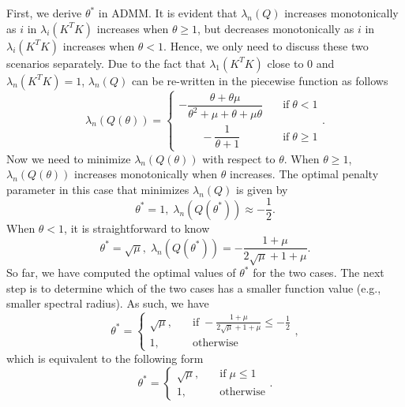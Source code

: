 \documentclass[letterpaper]{article} %
\begin{document}
First, we derive $\theta^*$ in ADMM. It is evident that $\lambda_n(Q)$ increases monotonically as $i$ in $\lambda_i(K^T K)$ increases when $\theta\geq 1$, but decreases monotonically as $i$ in $\lambda_i(K^T K)$ increases when $\theta< 1$. Hence, we only need to discuss these two scenarios separately. Due to the fact that $\lambda_{1} (K^T K)$ close to 0 and $\lambda_n (K^T K)=1$, $\lambda_n (Q)$ can be re-written in the piecewise function as follows
  \begin{equation*}
  	\lambda_n(Q(\theta))=
 	\begin{cases}
  		-\dfrac{\theta+\theta\mu}{\theta^2+\mu+\theta +\mu\theta}\quad & \text{if}\;\theta < 1 \\
  		\qquad-\dfrac{1 }{\theta+1}\quad & \text{if}\;\theta\geq 1 
  	\end{cases}.
  \end{equation*}
Now we need to minimize $\lambda_n(Q(\theta))$ with respect to $\theta$. When $\theta\geq 1$, $\lambda_n(Q(\theta))$ increases monotonically when $\theta$ increases. The optimal penalty parameter in this case that minimizes $\lambda_n(Q)$ is given by
\begin{equation*}
\theta^*=1,\; \lambda_n (Q(\theta^*))\approx -\frac{1}{2}.
\end{equation*}
When $\theta<1$, it is straightforward to know
\begin{equation*}\label{Q2}
	\theta^*=\sqrt{\mu},\; \lambda_n \left(Q(\theta^*)\right)=-\frac{1+\mu }{2 \sqrt{\mu}+1 +\mu }.
\end{equation*}
So far, we have computed the optimal values of $\theta^*$ for the two cases. The next step is to determine which of the two cases has a smaller function value (e.g., smaller spectral radius). As such, we have 
\begin{equation*}
	\theta^*=
	\begin{cases}
		\sqrt{\mu},\quad & \text{if}\;-\frac{1+\mu }{2 \sqrt{\mu}+1 +\mu } \leq -\frac{1}{2} \\
		1,\quad & \text{otherwise}
	\end{cases},
\end{equation*}
which is equivalent to the following form
\begin{equation*}
	\theta^*=
	\begin{cases}
		\sqrt{\mu},\quad & \text{if}\;\mu \leq 1 \\
		1,\quad & \text{otherwise}
	\end{cases}.
\end{equation*}
\end{document}
